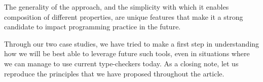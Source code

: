 \documentclass[sigconf]{acmart}
\begin{document}
The generality of the approach, and the simplicity with which it enables
composition of different properties, are unique features that make it a strong
candidate to impact programming practice in the future.

Through our two case studies, we have tried to make a first step in
understanding how we will be best able to leverage future such tools, even
in situations where we can manage to use current type-checkers today. As a closing
note, let us reproduce the principles that we have proposed throughout the article.

\vspace{-0.8cm}
\listofkeytheorems[
  ignoreall,
  show={principle},
  print-body,
  title={},
  ]



\end{document}

